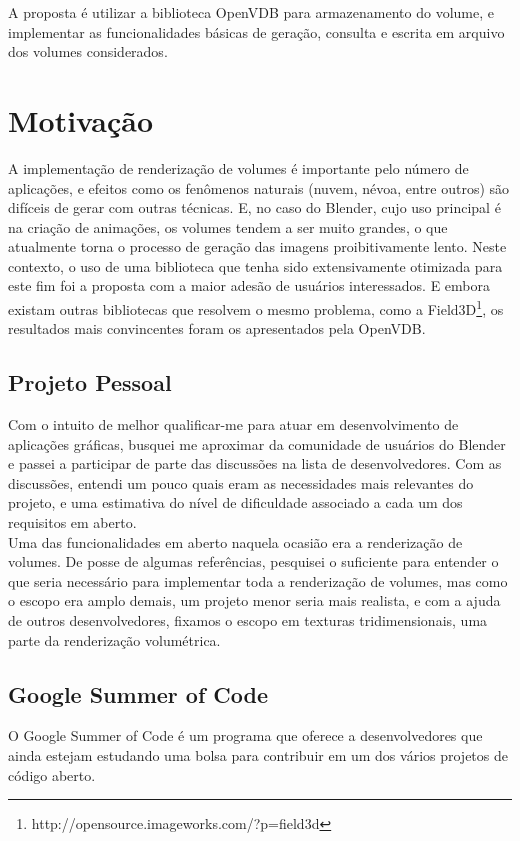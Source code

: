 A proposta é utilizar a biblioteca OpenVDB para armazenamento do volume, e implementar as funcionalidades básicas de geração, consulta e escrita em arquivo dos volumes considerados.

\section{Motivação}

A implementação de renderização de volumes é importante pelo número de aplicações, e efeitos como os fenômenos naturais (nuvem, névoa, entre outros) são difíceis de gerar com outras técnicas. E, no caso do Blender, cujo uso principal é na criação de animações, os volumes tendem a ser muito grandes, o que atualmente torna o processo de geração das imagens proibitivamente lento. Neste contexto, o uso de uma biblioteca que tenha sido extensivamente otimizada para este fim foi a proposta com a maior adesão de usuários interessados. E embora existam outras bibliotecas que resolvem o mesmo problema, como a Field3D\footnote{http://opensource.imageworks.com/?p=field3d}, os resultados mais convincentes foram os apresentados pela OpenVDB.


\subsection*{Projeto Pessoal}
Com o intuito de melhor qualificar-me para atuar em desenvolvimento de aplicações gráficas, busquei me aproximar da comunidade de usuários do Blender e passei a participar de parte das discussões na lista de desenvolvedores. Com as discussões, entendi um pouco quais eram as necessidades mais relevantes do projeto, e uma estimativa do nível de dificuldade associado a cada um dos requisitos em aberto. \\

Uma das funcionalidades em aberto naquela ocasião era a renderização de volumes. De posse de algumas referências, pesquisei o suficiente para entender o que seria necessário para implementar toda a renderização de volumes, mas como o escopo era amplo demais, um projeto menor seria mais realista, e com a ajuda de outros desenvolvedores, fixamos o escopo em texturas tridimensionais, uma parte da renderização volumétrica. 

\subsection*{Google Summer of Code}
O Google Summer of Code é um programa que oferece a desenvolvedores que ainda estejam estudando uma bolsa para contribuir em um dos vários projetos de código aberto. \\

